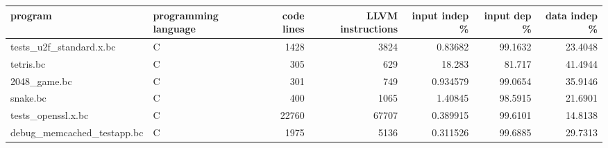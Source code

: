 \begin{tabular}{llrrrrr}
\hline
 program                    & programming language   &   code lines &   LLVM instructions &   input indep \% &   input dep \% &   data indep \% \\
\hline
 tests\_u2f\_standard.x.bc    & C                      &         1428 &                3824 &        0.83682  &       99.1632 &        23.4048 \\
 tetris.bc                  & C                      &          305 &                 629 &       18.283    &       81.717  &        41.4944 \\
 2048\_game.bc               & C                      &          301 &                 749 &        0.934579 &       99.0654 &        35.9146 \\
 snake.bc                   & C                      &          400 &                1065 &        1.40845  &       98.5915 &        21.6901 \\
 tests\_openssl.x.bc         & C                      &        22760 &               67707 &        0.389915 &       99.6101 &        14.8138 \\
 debug\_memcached\_testapp.bc & C                      &         1975 &                5136 &        0.311526 &       99.6885 &        29.7313 \\
\hline
\end{tabular}